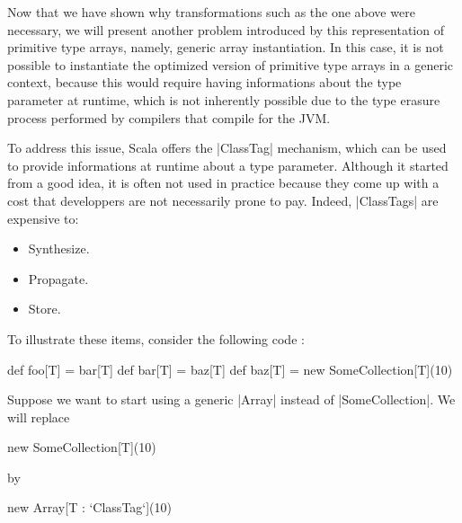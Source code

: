 
Now that we have shown why transformations such as the one above were necessary, we will present another problem introduced by this representation of primitive type arrays, namely, generic array instantiation. In this case, it is not possible to instantiate the optimized version of primitive type arrays in a generic context, because this would require having informations about the type parameter at runtime, which is not inherently possible due to the type erasure process performed by compilers that compile for the JVM.


To address this issue, Scala offers the |ClassTag| mechanism, which can be used to provide informations at runtime about a type parameter. Although it started from a good idea, it is often not used in practice because they come up with a cost that developpers are not necessarily prone to pay. Indeed, |ClassTags| are expensive to:


\begin{itemize}
  \item Synthesize.
  \item Propagate.
  \item Store.
\end{itemize}

To illustrate these items, consider the following code :

\begin{lstlisting-nobreak}
  def foo[T] = bar[T]
  def bar[T] = baz[T]
  def baz[T] = new SomeCollection[T](10)
\end{lstlisting-nobreak}

Suppose we want to start using a generic |Array| instead of |SomeCollection|. We will replace

\begin{lstlisting-nobreak}
  new SomeCollection[T](10)
\end{lstlisting-nobreak}

by

\begin{lstlisting-nobreak}
  new Array[T : `ClassTag`](10)
\end{lstlisting-nobreak}

